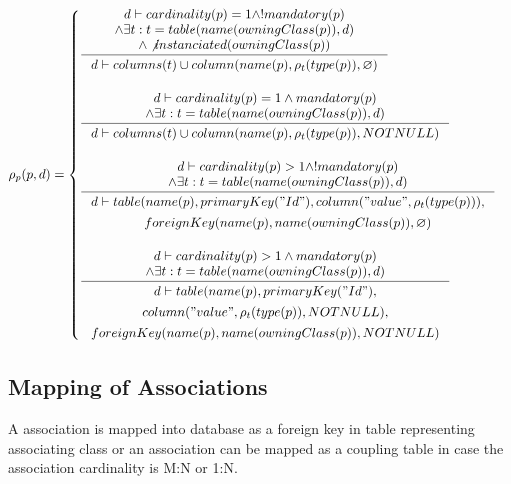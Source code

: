 \documentclass[11pt]{article}
\begin{document}
$\rho_p(p, d) = \begin{cases}
  \inference{ d \vdash cardinality(p) = 1 \wedge ! mandatory(p)
 \\ \wedge \exists t : t = table(name(owningClass(p)), d) 
 \\ \wedge \not instanciated(owningClass(p))
 }{\begin{gathered}
	 d \vdash columns(t) \cup column(name(p), \rho_t(type(p)), \varnothing )
\end{gathered}
 } \\ \\

  \inference{ d \vdash cardinality(p) = 1 \wedge mandatory(p)
 \\ \wedge \exists t : t = table(name(owningClass(p)), d)}{\begin{gathered}
 	d \vdash columns(t) \cup column(name(p), \rho_t(type(p)), NOTNULL ) \\
 	
 	
\end{gathered}
} 
\\ \\
 
 \inference{d \vdash cardinality(p) > 1 \wedge ! mandatory(p) \\ \wedge \exists t : t = table(name(owningClass(p)), d)}{\begin{gathered}d \vdash  table(name(p), primaryKey("Id"), column("value", \rho_t(type(p))), \\ foreignKey(name(p), name(owningClass(p)), \varnothing) \\
 
\end{gathered}}
\\ \\

 \inference{d \vdash cardinality(p) > 1 \wedge mandatory(p) \\ \wedge \exists t : t = table(name(owningClass(p)), d) }{\begin{gathered}d \vdash  table(name(p), primaryKey("Id"), \\ column("value", \rho_t(type(p)), NOTNULL), \\ foreignKey(name(p), name(owningClass(p)), NOTNULL)
	 \end{gathered}}
 \end{cases}$

\subsection{Mapping of Associations}
A association is mapped into database as a foreign key in table representing associating class or an association can be mapped as a coupling table in case the association cardinality is M:N or 1:N.
\end{document}

